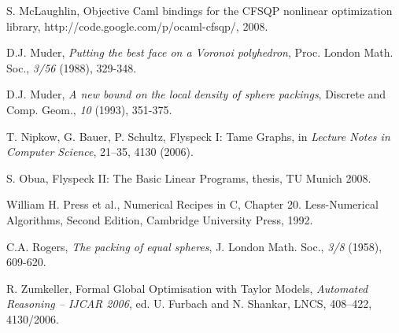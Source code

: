 \documentclass{llncs}
\begin{document}
\begin{thebibliography}{HeHa94}
 S. McLaughlin,
Objective Caml bindings for the CFSQP nonlinear optimization library, http://code.google.com/p/ocaml-cfsqp/, 2008.

 D.J. Muder, {\it Putting the best face on a Voronoi
polyhedron}, Proc. London Math. Soc., \emph{3/56} (1988), 329-348.




 D.J. Muder, {\it A new bound on the local density of
sphere packings}, Discrete and Comp. Geom., \emph{10} (1993), 351-375.

  T. Nipkow, G. Bauer, P. Schultz, Flyspeck I: Tame Graphs, in
{\it Lecture Notes in Computer Science}, 21--35, 4130 (2006). 

  S. Obua, Flyspeck II: The Basic Linear Programs,
thesis, TU Munich 2008.

 William H. Press et al., Numerical Recipes in C,
Chapter 20. Less-Numerical Algorithms, Second Edition, Cambridge
University Press, 1992.

 C.A. Rogers, {\it The packing of equal spheres},
J. London Math. Soc., \emph{3/8} (1958), 609-620.



  R. Zumkeller,  Formal Global Optimisation with
 Taylor Models, {\it Automated Reasoning -- IJCAR 2006},
 ed. U. Furbach and N. Shankar, LNCS, 408--422, 4130/2006.


\end{thebibliography}
\end{document}
